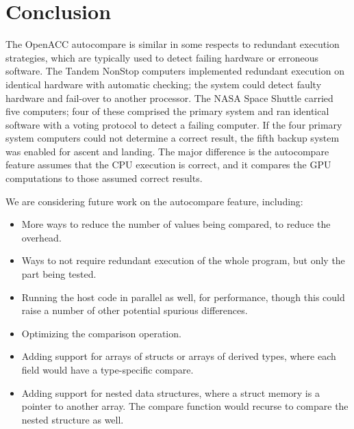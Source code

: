 \section{Conclusion}

The OpenACC autocompare is similar in some respects to redundant execution strategies, which are typically used to detect failing hardware or erroneous software.
The Tandem NonStop computers\cite{bartlett.tandem.86} implemented redundant execution on identical hardware with automatic checking; the system could detect faulty hardware and fail-over to another processor.
The NASA Space Shuttle carried five computers\cite{fraser.astro.74}; four of these comprised the primary system and ran identical software with a voting protocol to detect a failing computer.
If the four primary system computers could not determine a correct result, the fifth backup system was enabled for ascent and landing.
The major difference is the autocompare feature assumes that the CPU execution is correct, and it compares the GPU computations to those assumed correct results.

We are considering future work on the autocompare feature, including:
\begin{itemize}
\item More ways to reduce the number of values being compared, to reduce the overhead.
\item Ways to not require redundant execution of the whole program, but only the part being tested.
\item Running the host code in parallel as well, for performance, though this could raise a number of other potential spurious differences.
\item Optimizing the comparison operation.
\item Adding support for arrays of structs or arrays of derived types, where each field would have a type-specific compare.
\item Adding support for nested data structures, where a struct memory is a pointer to another array.
The compare function would recurse to compare the nested structure as well.
\end{itemize}
